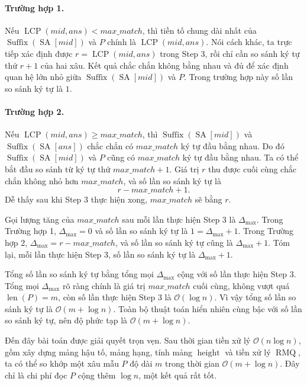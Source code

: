 \documentclass[11pt]{article}
\newcommand{\Oh}{\mathcal{O}}
\newcommand{\SA}{\operatorname{SA}}
\newcommand{\Height}{\operatorname{height}}
\newcommand{\Suf}{\operatorname{Suffix}}
\newcommand{\Len}{\operatorname{len}}
\newcommand{\LCP}{\operatorname{LCP}}
\newcommand{\RMQ}{\operatorname{RMQ}}
\begin{document}
\paragraph{Trường hợp 1.}
Nếu \(\LCP(\mathit{mid},\mathit{ans})<\mathit{max\_match}\), thì tiền tố chung
dài nhất của \(\Suf(\SA[\mathit{mid}])\) và \(P\) chính là
\(\LCP(\mathit{mid},\mathit{ans})\). Nói cách khác, ta trực tiếp xác định
được \(r=\LCP(\mathit{mid},\mathit{ans})\) trong Step 3, rồi chỉ cần so sánh
ký tự thứ \(r+1\) của hai xâu. Kết quả chắc chắn không bằng nhau và đủ để xác
định quan hệ lớn nhỏ giữa \(\Suf(\SA[\mathit{mid}])\) và \(P\). Trong trường
hợp này số lần so sánh ký tự là \(1\).

\paragraph{Trường hợp 2.}
Nếu \(\LCP(\mathit{mid},\mathit{ans})\ge\mathit{max\_match}\), thì
\(\Suf(\SA[\mathit{mid}])\) và \(\Suf(\SA[\mathit{ans}])\) chắc chắn có
\(\mathit{max\_match}\) ký tự đầu bằng nhau. Do đó
\(\Suf(\SA[\mathit{mid}])\) và \(P\) cũng có \(\mathit{max\_match}\) ký tự
đầu bằng nhau. Ta có thể bắt đầu so sánh từ ký tự thứ
\(\mathit{max\_match}+1\). Giá trị \(r\) thu được cuối cùng chắc chắn không
nhỏ hơn \(\mathit{max\_match}\), và số lần so sánh ký tự là
\[
  r-\mathit{max\_match}+1.
\]
Dễ thấy sau khi Step 3 thực hiện xong, \(\mathit{max\_match}\) sẽ bằng \(r\).

Gọi lượng tăng của \(\mathit{max\_match}\) sau mỗi lần thực hiện Step 3 là
\(\Delta_{\max}\). Trong Trường hợp 1, \(\Delta_{\max}=0\) và số lần so sánh
ký tự là \(1=\Delta_{\max}+1\). Trong Trường hợp 2,
\(\Delta_{\max}=r-\mathit{max\_match}\), và số lần so sánh ký tự cũng là
\(\Delta_{\max}+1\). Tóm lại, mỗi lần thực hiện Step 3, số lần so sánh ký tự
là \(\Delta_{\max}+1\).

Tổng số lần so sánh ký tự bằng tổng mọi \(\Delta_{\max}\) cộng với số lần
thực hiện Step 3. Tổng mọi \(\Delta_{\max}\) rõ ràng chính là giá trị
\(\mathit{max\_match}\) cuối cùng, không vượt quá \(\Len(P)=m\), còn số lần
thực hiện Step 3 là \(\Oh(\log n)\). Vì vậy tổng số lần so sánh ký tự là
\(\Oh(m+\log n)\). Toàn bộ thuật toán hiển nhiên cùng bậc với số lần so sánh
ký tự, nên độ phức tạp là \(\Oh(m+\log n)\).

Đến đây bài toán được giải quyết trọn vẹn. Sau thời gian tiền xử lý
\(\Oh(n\log n)\), gồm xây dựng mảng hậu tố, mảng hạng, tính mảng \(\Height\)
và tiền xử lý \(\RMQ\), ta có thể so khớp một xâu mẫu \(P\) độ dài \(m\)
trong thời gian \(\Oh(m+\log n)\). Đây chỉ là chi phí đọc \(P\) cộng thêm
\(\log n\), một kết quả rất tốt.
\end{document}
